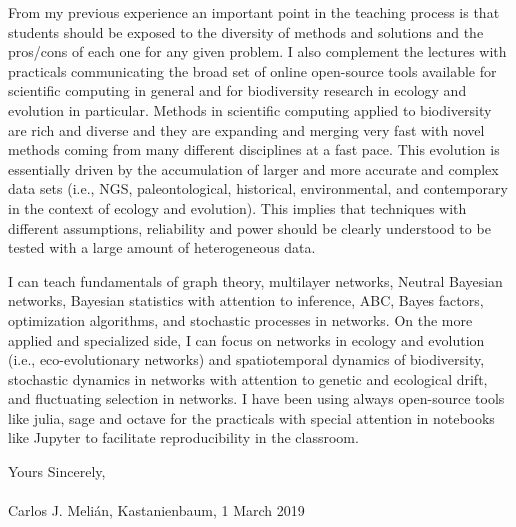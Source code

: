 \documentclass[a4paper,12pt]{article}
\begin{document}
From my previous experience an important point in the teaching process
is that students should be exposed to the diversity of methods and
solutions and the pros/cons of each one for any given problem. I also
complement the lectures with practicals communicating the broad set of
online open-source tools available for scientific computing in general
and for biodiversity research in ecology and evolution in
particular. Methods in scientific computing applied to biodiversity
are rich and diverse and they are expanding and merging very fast with
novel methods coming from many different disciplines at a fast
pace. This evolution is essentially driven by the accumulation of
larger and more accurate and complex data sets (i.e., NGS,
paleontological, historical, environmental, and contemporary in the
context of ecology and evolution). This implies that techniques with
different assumptions, reliability and power should be clearly
understood to be tested with a large amount of heterogeneous data.

I can teach fundamentals of graph theory, multilayer networks, Neutral
Bayesian networks, Bayesian statistics with attention to inference,
ABC, Bayes factors, optimization algorithms, and stochastic processes
in networks. On the more applied and specialized side, I can focus on
networks in ecology and evolution (i.e., eco-evolutionary networks)
and spatiotemporal dynamics of biodiversity, stochastic dynamics in
networks with attention to genetic and ecological drift, and
fluctuating selection in networks. I have been using always
open-source tools like julia, sage and octave for the practicals with
special attention in notebooks like Jupyter to facilitate
reproducibility in the classroom.

  \vspace{0.2 in}

Yours Sincerely,
\\
\\
Carlos J. Meli\'an,  \hspace{0.2 in} Kastanienbaum, 1 March 2019\\
\end{document}
